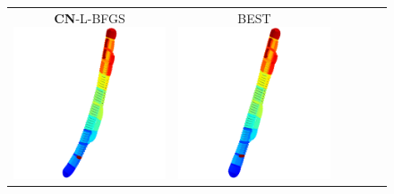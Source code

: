 \documentclass[dvipdfmx,10pt,journal,compsoc]{IEEEtran}
\begin{document}
\begin{figure}[btp]
\begin{tabular}{cccccc}
    \makecell{\small{\textsf{\textbf{CN}-L-BFGS}}                                                                                                        \\[-0.2em]\includegraphics[width=0.27\columnwidth]{individual/vis/dwt_2680_CN-L-BFGS.png}} &
    \makecell{\small{\textsf{BEST}}                                                                                                                      \\[-0.2em]\includegraphics[width=0.27\columnwidth]{individual/vis/opt_dwt_2680.png}} \\


\end{tabular}
\end{figure}
\end{document}
